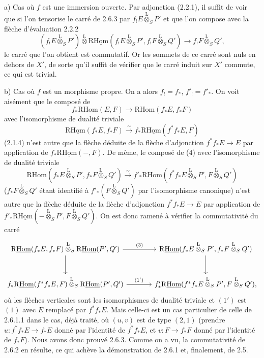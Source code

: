 a) Cas où $f$ est une immersion ouverte. Par adjonction (2.2.1), il suffit de voir que si l'on tensorise le carré de 2.6.3 par $f_!E\overset{\mathrm{L}}{\otimes}_SP'$ et que l'on compose avec la flèche d'évaluation 2.2.2
\[
(f_!E\overset{\mathrm{L}}{\otimes}_SP')\overset{\mathrm{L}}{\otimes}\mathrm{R}\underline{\mathrm{Hom}}(f_!E\overset{\mathrm{L}}{\otimes}_SP',f_!F\overset{\mathrm{L}}{\otimes}_SQ')\longrightarrow f_!F\overset{\mathrm{L}}{\otimes}_SQ',
\]
le carré que l'on obtient est commutatif. Or les sommets de ce carré sont nuls en
dehors de $X'$, de sorte qu'il suffit de vérifier que le carré induit sur $X'$ commute, ce qui est trivial.

b) Cas où $f$ est un morphisme propre. On a alors $f_!=f_*$, $f'_!=f'_*$. On voit aisément que le composé de
\[
f_*\mathrm{R}\underline{\mathrm{Hom}}(E,F)\longrightarrow\mathrm{R}\underline{\mathrm{Hom}}(f_*E,f_*F)
\]
avec l'isomorphisme de dualité triviale
\[
\mathrm{R}\underline{\mathrm{Hom}}(f_*E,f_*F)\xrightarrow{\sim}f_*\mathrm{R}\underline{\mathrm{Hom}}(f^{*}f_*E,F)
\]
(2.1.4) n'est autre que la flèche déduite de la flèche d'adjonction $f^{*}f_*E\to E$ par application de $f_*\mathrm{R}\underline{\mathrm{Hom}}(-,F)$. De même, le composé de (4) avec l'isomorphisme de dualité triviale
\[
\mathrm{R}\underline{\mathrm{Hom}}(f_*E\overset{\mathrm{L}}{\otimes}_SP',f_*F\overset{\mathrm{L}}{\otimes}_SQ')\xrightarrow{\sim}f'_*\mathrm{R}\underline{\mathrm{Hom}}(f^{*}f_*E\overset{\mathrm{L}}{\otimes}_SP',F\overset{\mathrm{L}}{\otimes}_SQ')
\]
($f_*F\overset{\mathrm{L}}{\otimes}_SQ'$ étant identifié à $f'_*(F\overset{\mathrm{L}}{\otimes}_SQ')$ par l'isomorphisme canonique) n'est autre que la flèche déduite de la flèche d'adjonction $f^{*}f_*E\to E$ par application de $f'_*\mathrm{R}\underline{\mathrm{Hom}}(-\overset{\mathrm{L}}{\otimes}_SP',F\overset{\mathrm{L}}{\otimes}_SQ')$. On est donc ramené à vérifier la commutativité du carré
\[
\begin{tikzcd}[column sep=large,row sep=large]
\mathrm{R}\underline{\mathrm{Hom}}(f_*E,f_*F)\overset{\mathrm{L}}{\otimes}_S\mathrm{R}\underline{\mathrm{Hom}}(P',Q') \arrow[r,"(3)"] \arrow[d] & \mathrm{R}\underline{\mathrm{Hom}}(f_*E\overset{\mathrm{L}}{\otimes}_SP',f_*F\overset{\mathrm{L}}{\otimes}_SQ') \arrow[d]\\
f_*\mathrm{R}\underline{\mathrm{Hom}}(f^{*}f_*E,F)\overset{\mathrm{L}}{\otimes}_S\mathrm{R}\underline{\mathrm{Hom}}(P',Q') \arrow[r,"(1')"] & f'_*\mathrm{R}\underline{\mathrm{Hom}}(f^{*}f_*E\overset{\mathrm{L}}{\otimes}_SP',F\overset{\mathrm{L}}{\otimes}_SQ'),
\end{tikzcd}
\]
où les flèches verticales sont les isomorphismes de dualité triviale et $(1')$ est $(1)$ avec $E$ remplacé par $f^{*}f_*E$. Mais celle-ci est un cas particulier de celle de 2.6.1.1 dans le cas, déjà traité, où $(u,v)$ est de type $(2,1)$ (prendre $u:f^{*}f_*E\to f_*E$ donné par l'identité de $f^{*}f_*E$, et $v:F\to f_*F$ donné par l'identité de $f_*F$). Nous avons donc prouvé 2.6.3. Comme on a vu, la commutativité de 2.6.2 en résulte, ce qui achève la démonstration de 2.6.1 et, finalement, de 2.5.

